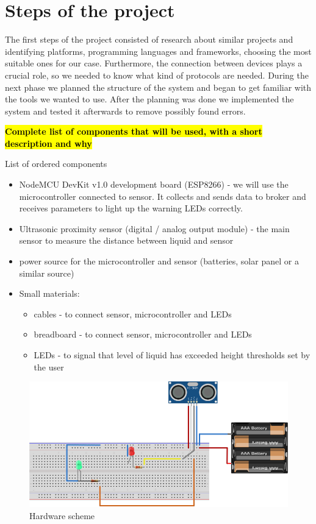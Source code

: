 \documentclass{article}
\begin{document}
\section{Steps of the project}

The first steps of the project consisted of research about similar projects and
identifying platforms, programming languages and frameworks, choosing
the most suitable ones for our case. Furthermore, the connection between devices plays a crucial role, so we needed to know what kind of protocols are needed.
During the next phase we planned the structure of the system and began to get familiar with the tools we wanted to use. After the planning was done we implemented the system and tested it afterwards to remove possibly found errors.\par 

\textcolor{red}{\textbf{\hl{Complete list of components that will be used, with a short description and why}}}

List of ordered components
\begin{itemize}
\item NodeMCU DevKit v1.0 development board (ESP8266) - we will use the microcontroller connected to sensor. It collects and sends data to broker and receives parameters to light up the warning LEDs correctly.
\item Ultrasonic proximity sensor (digital / analog output module) - the main sensor to measure the distance between liquid and sensor
\item power source for the microcontroller and sensor (batteries, solar panel or a similar source)
\item Small materials: 
	\begin{itemize}
		\item cables - to connect sensor, microcontroller and LEDs
		\item breadboard - to connect sensor, microcontroller and LEDs
		\item LEDs - to signal that level of liquid has exceeded height thresholds set by the user
	\end{itemize}
\end{itemize}

\begin{figure}[]
	\centering
	\includegraphics[scale=0.4]{images/schema_bb.png}
	\caption{Hardware scheme}	
	\label{schema_bb}
\end{figure}
\end{document}
